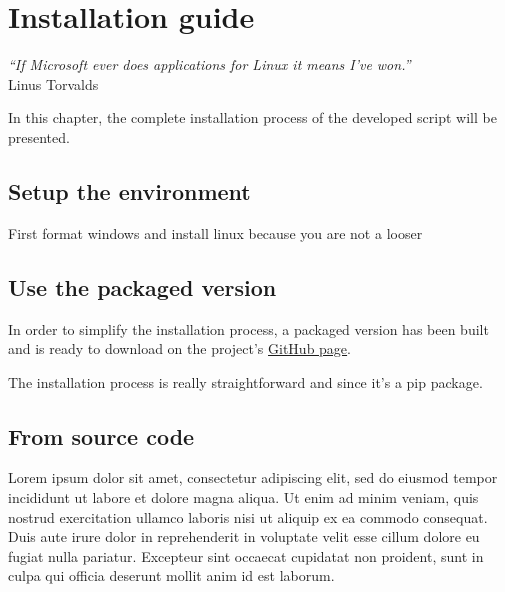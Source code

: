 

\chapter{Installation guide} %
\label{chap:installation}
\begin{flushright}
\textit{``If Microsoft ever does applications for Linux it means I've won.''} \\ Linus Torvalds
\end{flushright}


In this chapter, the complete installation process of the developed script will be presented.

\section {Setup the environment}
First format windows and install linux because you are not a looser

\section{Use the packaged version}
In order to simplify the installation process, a packaged version has been built and is ready to download on the project's \href{https://github.com/dchenaux/Yoda}{GitHub page}.

The installation process is really straightforward and since it's a \gls{pip} package.

\section{From source code}
Lorem ipsum dolor sit amet, consectetur adipiscing elit, sed do eiusmod tempor incididunt ut labore et dolore magna aliqua. Ut enim ad minim veniam, quis nostrud exercitation ullamco laboris nisi ut aliquip ex ea commodo consequat. Duis aute irure dolor in reprehenderit in voluptate velit esse cillum dolore eu fugiat nulla pariatur. Excepteur sint occaecat cupidatat non proident, sunt in culpa qui officia deserunt mollit anim id est laborum.
